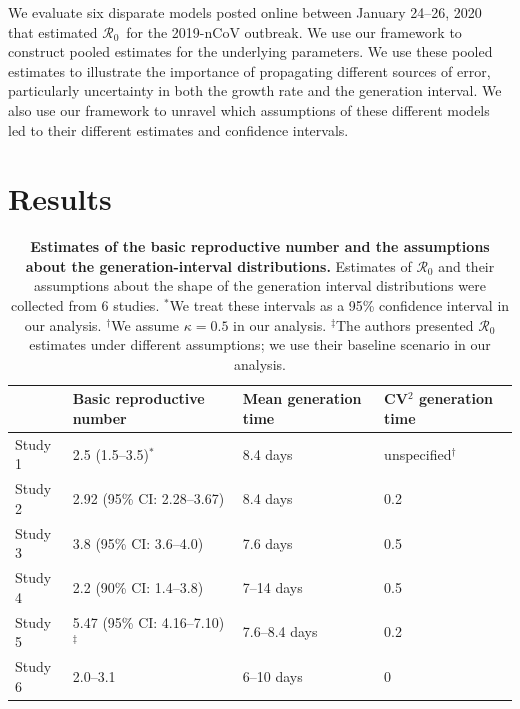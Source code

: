 \documentclass[12pt]{article}
\newcommand{\Rx}[1]{\ensuremath{{\mathcal R}_{#1}}}
\newcommand{\Ro}{\Rx{0}}
\begin{document}
We evaluate six disparate models posted online between January 24--26, 2020 that estimated \Ro\ for the 2019-nCoV outbreak. We use our framework to construct pooled estimates for the underlying parameters. We use these pooled estimates to illustrate the importance of propagating different sources of error, particularly uncertainty in both the growth rate and the generation interval. We also use our framework to unravel which assumptions of these different models led to their different estimates and confidence intervals.

\section{Results}

\begin{table}[t]
\begin{center}
\footnotesize
\begin{tabular}{l|l|l|l}
 & Basic reproductive number & Mean generation time & CV$^2$ generation time \\
\hline
Study 1 & 2.5 (1.5--3.5)$^\ast$ & 8.4 days & unspecified$^\dagger$ \\
\hline
Study 2 & 2.92 (95\% CI: 2.28--3.67) & 8.4 days & 0.2 \\
\hline
Study 3 & 3.8 (95\% CI: 3.6--4.0) & 7.6 days & 0.5 \\
\hline
Study 4 & 2.2 (90\% CI: 1.4--3.8) & 7--14 days & 0.5\\
\hline
Study 5 & 5.47 (95\% CI: 4.16--7.10)$^\ddagger$ & 7.6--8.4 days & 0.2\\
\hline
Study 6 & 2.0--3.1 & 6--10 days & 0 \\
\hline
\end{tabular}
\end{center}
\caption{
\textbf{Estimates of the basic reproductive number and the assumptions about the generation-interval distributions.}
Estimates of $\mathcal R_0$ and their assumptions about the shape of the generation interval distributions were collected from 6 studies.
$^\ast$We treat these intervals as a 95\% confidence interval in our analysis.
$^\dagger$We assume $\kappa = 0.5$ in our analysis.
$^\ddagger$The authors presented $\mathcal R_0$ estimates under different assumptions; we use their baseline scenario in our analysis.
}
\end{table}
\end{document}
